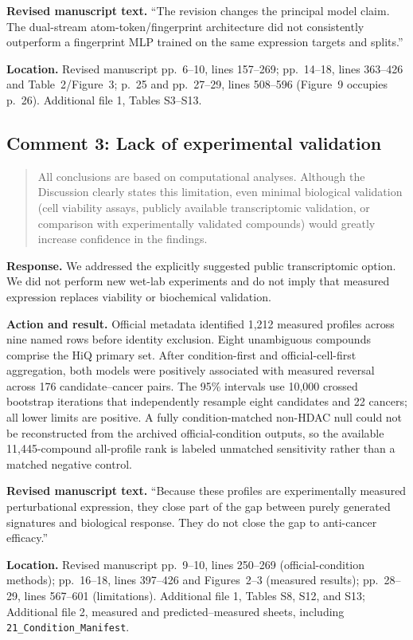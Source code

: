 \documentclass[10pt]{article}
\newenvironment{reviewcomment}{%
  \begin{quote}\small\itshape\color{black}
}{\end{quote}}
\newcommand{\Response}{\textbf{Response.} }
\newcommand{\Action}{\textbf{Action and result.} }
\newcommand{\RevisedText}{\textbf{Revised manuscript text.} }
\newcommand{\Location}{\textbf{Location.} }
\newcommand{\qtext}[1]{``#1''}
\begin{document}
\RevisedText \qtext{The revision changes the principal model claim. The dual-stream atom-token/\allowbreak fingerprint architecture did not consistently outperform a fingerprint MLP trained on the same expression targets and splits.}

\Location Revised manuscript pp.~6--10, lines 157--269; pp.~14--18, lines 363--426 and Table~2/Figure~3; p.~25 and pp.~27--29, lines 508--596 (Figure~9 occupies p.~26). Additional file 1, Tables S3--S13.

\subsection*{Comment 3: Lack of experimental validation}
\begin{reviewcomment}
All conclusions are based on computational analyses. Although the Discussion clearly states this limitation, even minimal biological validation (cell viability assays, publicly available transcriptomic validation, or comparison with experimentally validated compounds) would greatly increase confidence in the findings.
\end{reviewcomment}

\Response We addressed the explicitly suggested public transcriptomic option. We did not perform new wet-lab experiments and do not imply that measured expression replaces viability or biochemical validation.

\Action Official metadata identified 1,212 measured profiles across nine named rows before identity exclusion. Eight unambiguous compounds comprise the HiQ primary set. After condition-first and official-cell-first aggregation, both models were positively associated with measured reversal across 176 candidate--cancer pairs. The 95\% intervals use 10,000 crossed bootstrap iterations that independently resample eight candidates and 22 cancers; all lower limits are positive. A fully condition-matched non-HDAC null could not be reconstructed from the archived official-condition outputs, so the available 11,445-compound all-profile rank is labeled unmatched sensitivity rather than a matched negative control.

\RevisedText \qtext{Because these profiles are experimentally measured perturbational expression, they close part of the gap between purely generated signatures and biological response. They do not close the gap to anti-cancer efficacy.}

\Location Revised manuscript pp.~9--10, lines 250--269 (official-condition methods); pp.~16--18, lines 397--426 and Figures~2--3 (measured results); pp.~28--29, lines 567--601 (limitations). Additional file 1, Tables S8, S12, and S13; Additional file 2, measured and predicted--measured sheets, including \texttt{21\_Condition\_Manifest}.
\end{document}
